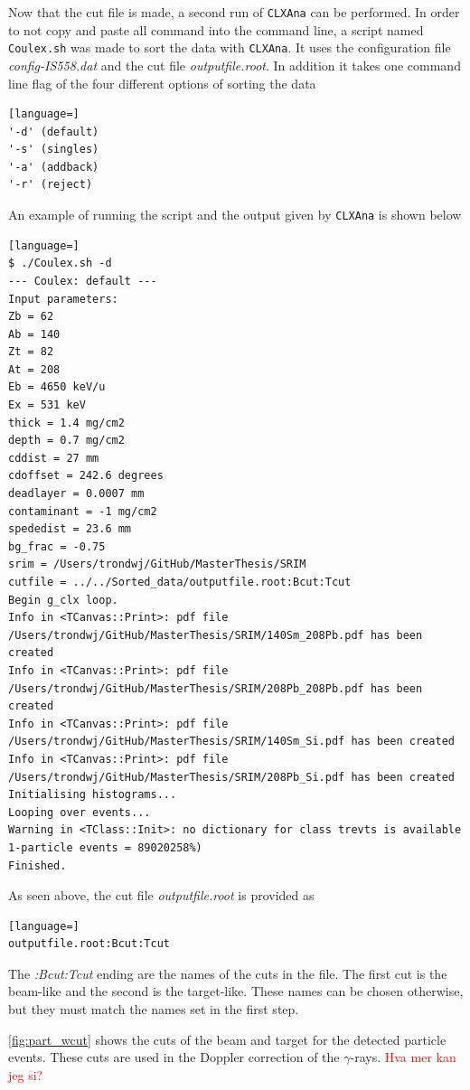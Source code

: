 \documentclass[twoside,english]{uiofysmaster/uiofysmaster}
\newcommand{\ga}{$\gamma$}
\let\orgautoref\autoref
\renewcommand{\autoref}
        {%
		 \def\sectionautorefname{Section}%
		 \def\subsectionautorefname{Section}%
		 \def\subsubsectionautorefname{Section}%
		 \def\chapterautorefname{Chapter}%
          \orgautoref}
\begin{document}
Now that the cut file is made, a second run of \texttt{CLXAna} can be performed. 
In order to not copy and paste all command into the command line, a script named \texttt{Coulex.sh} was made to sort the data with \texttt{CLXAna}. 
It uses the configuration file \textit{config-IS558.dat} and the cut file \textit{outputfile.root}. 
In addition it takes one command line flag of the four different options of sorting the data
\begin{lstlisting}[language=]
'-d' (default)
'-s' (singles) 
'-a' (addback) 
'-r' (reject)
\end{lstlisting}
An example of running the script and the output given by \texttt{CLXAna} is shown below
\begin{lstlisting}[language=]
$ ./Coulex.sh -d
--- Coulex: default ---
Input parameters:
Zb = 62
Ab = 140
Zt = 82
At = 208
Eb = 4650 keV/u
Ex = 531 keV
thick = 1.4 mg/cm2
depth = 0.7 mg/cm2
cddist = 27 mm
cdoffset = 242.6 degrees
deadlayer = 0.0007 mm
contaminant = -1 mg/cm2
spededist = 23.6 mm
bg_frac = -0.75
srim = /Users/trondwj/GitHub/MasterThesis/SRIM
cutfile = ../../Sorted_data/outputfile.root:Bcut:Tcut
Begin g_clx loop.
Info in <TCanvas::Print>: pdf file /Users/trondwj/GitHub/MasterThesis/SRIM/140Sm_208Pb.pdf has been created
Info in <TCanvas::Print>: pdf file /Users/trondwj/GitHub/MasterThesis/SRIM/208Pb_208Pb.pdf has been created
Info in <TCanvas::Print>: pdf file /Users/trondwj/GitHub/MasterThesis/SRIM/140Sm_Si.pdf has been created
Info in <TCanvas::Print>: pdf file /Users/trondwj/GitHub/MasterThesis/SRIM/208Pb_Si.pdf has been created
Initialising histograms...
Looping over events...
Warning in <TClass::Init>: no dictionary for class trevts is available
1-particle events = 89020258%)    
Finished.
\end{lstlisting}
As seen above, the cut file \textit{outputfile.root} is provided as  
\begin{lstlisting}[language=]
outputfile.root:Bcut:Tcut
\end{lstlisting}
The \textit{:Bcut:Tcut} ending are the names of the cuts in the file. The first cut is the beam-like and the second is the target-like. 
These names can be chosen otherwise, but they must match the names set in the first step. 

\autoref{fig:part_wcut} shows the cuts of the beam and target for the detected particle events. 
These cuts are used in the Doppler correction of the \ga-rays. 
\textcolor{red}{Hva mer kan jeg si?} 
\end{document}
